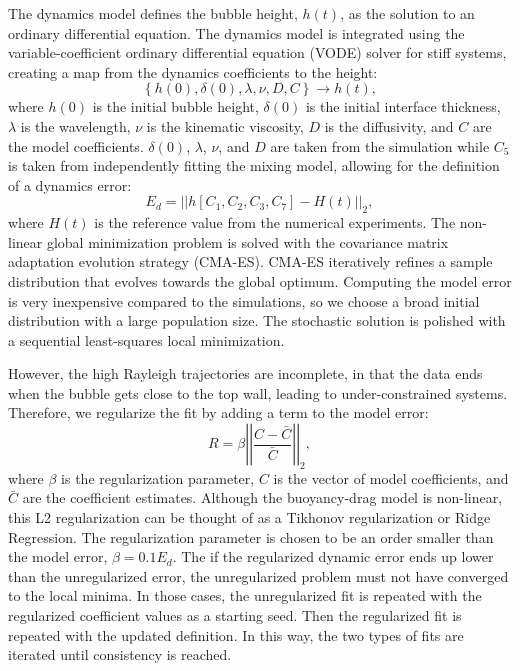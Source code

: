 The dynamics model defines the bubble height, $h(t)$, as the solution to an ordinary differential equation.
The dynamics model is integrated using the variable-coefficient ordinary differential equation (VODE) solver for stiff systems, creating a map from the dynamics coefficients to the height:
\begin{equation}
\left\{h(0), \delta(0), \lambda, \nu, D, C\right\} \rightarrow h(t),
\end{equation}
where $h(0)$ is the initial bubble height,
$\delta(0)$ is the initial interface thickness,
$\lambda$ is the wavelength,
$\nu$ is the kinematic viscosity,
$D$ is the diffusivity, and
$C$ are the model coefficients.
$\delta(0)$, $\lambda$, $\nu$, and $D$ are taken from the simulation while $C_5$ is taken from independently fitting the mixing model, allowing for the definition of a dynamics error:
\begin{equation}
E_d = \left| \left| h\left[C_1, C_2, C_3, C_7\right] - H(t)\right| \right|_2,
\end{equation}
where $H(t)$ is the reference value from the numerical experiments.
The non-linear global minimization problem is solved with the covariance matrix adaptation evolution strategy (CMA-ES).
CMA-ES iteratively refines a sample distribution that evolves towards the global optimum.
Computing the model error is very inexpensive compared to the simulations, so we choose a broad initial distribution with a large population size.
The stochastic solution is polished with a sequential least-squares local minimization.

However, the high Rayleigh trajectories are incomplete, in that the data ends when the bubble gets close to the top wall, leading to under-constrained systems.
Therefore, we regularize the fit by adding a term to the model error:
\begin{equation}
R = \beta \left| \left| \frac{C - \bar{C}}{\bar{C}} \right| \right|_2,
\end{equation}
where $\beta$ is the regularization parameter,
$C$ is the vector of model coefficients, and
$\bar{C}$ are the coefficient estimates.
Although the buoyancy-drag model is non-linear, this L2 regularization can be thought of as a Tikhonov regularization or Ridge Regression.
The regularization parameter is chosen to be an order smaller than the model error, $\beta = 0.1 E_d$.
The if the regularized dynamic error ends up lower than the unregularized error, the unregularized problem must not have converged to the local minima.
In those cases, the unregularized fit is repeated with the regularized coefficient values as a starting seed.
Then the regularized fit is repeated with the updated definition.
In this way, the two types of fits are iterated until consistency is reached.

